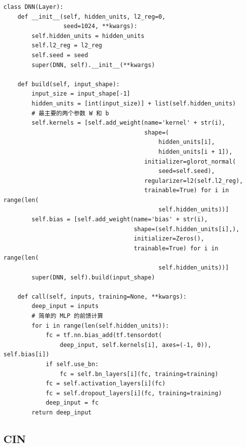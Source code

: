 \documentclass[degree=project,degree-type=project,cjk-font=noto]{thuthesis}
\begin{document}
  \begin{verbatim}
class DNN(Layer):
    def __init__(self, hidden_units, l2_reg=0,
                 seed=1024, **kwargs):
        self.hidden_units = hidden_units
        self.l2_reg = l2_reg
        self.seed = seed
        super(DNN, self).__init__(**kwargs)

    def build(self, input_shape):
        input_size = input_shape[-1]
        hidden_units = [int(input_size)] + list(self.hidden_units)
        # 最主要的两个参数 W 和 b
        self.kernels = [self.add_weight(name='kernel' + str(i),
                                        shape=(
                                            hidden_units[i],
                                            hidden_units[i + 1]),
                                        initializer=glorot_normal(
                                            seed=self.seed),
                                        regularizer=l2(self.l2_reg),
                                        trainable=True) for i in range(len(
                                            self.hidden_units))]
        self.bias = [self.add_weight(name='bias' + str(i),
                                     shape=(self.hidden_units[i],),
                                     initializer=Zeros(),
                                     trainable=True) for i in range(len(
                                            self.hidden_units))]
        super(DNN, self).build(input_shape)

    def call(self, inputs, training=None, **kwargs):
        deep_input = inputs
        # 简单的 MLP 的前馈计算
        for i in range(len(self.hidden_units)):
            fc = tf.nn.bias_add(tf.tensordot(
                deep_input, self.kernels[i], axes=(-1, 0)), self.bias[i])
            if self.use_bn:
                fc = self.bn_layers[i](fc, training=training)
            fc = self.activation_layers[i](fc)
            fc = self.dropout_layers[i](fc, training=training)
            deep_input = fc
        return deep_input
  \end{verbatim}

\subsection{CIN}
\end{document}

